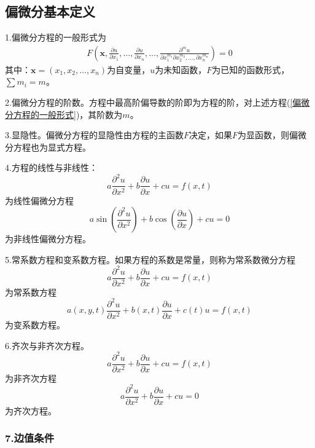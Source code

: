     \subsection{偏微分基本定义}
        \par
        1.偏微分方程的一般形式为
        \begin{align}
            \label{偏微分方程的一般形式}
            F\left ( \mathbf{x},\frac{\partial u}{\partial x_1},\dots,\frac{\partial u}{\partial x_n}, \dots,\frac{\partial ^m u}{\partial x_1^{m_1} \partial x_2^{m_2},\dots,\partial x_n^{m_n}}\right) = 0
        \end{align}
        其中：$\mathbf{x} = (x_1,x_2,\dots,x_n)$为自变量，$u$为未知函数，$F$为已知的函数形式，$\sum m_i = m$。
        \par
        2.偏微分方程的阶数。方程中最高阶偏导数的阶即为方程的阶，对上述方程(\ref{偏微分方程的一般形式})，其阶数为$m$。
        \par
        3.显隐性。偏微分方程的显隐性由方程的主函数$F$决定，如果$F$为显函数，则偏微分方程也为显式方程。
        \par
        4.方程的线性与非线性：
        \[
            a \frac{\partial^2 u}{\partial x^2} +b\frac{\partial u}{\partial x} + cu = f(x,t)
        \]
        为线性偏微分方程
        \[
            a \sin \left( \frac{\partial^2 u}{\partial x^2}\right ) +b \cos \left(\frac{\partial u}{\partial x}\right ) + cu = 0
        \]
        为非线性偏微分方程。\par
        5.常系数方程和变系数方程。如果方程的系数是常量，则称为常系数微分方程
        \[
            a \frac{\partial^2 u}{\partial x^2} +b\frac{\partial u}{\partial x} + cu = f(x,t)
        \]
        为常系数方程
        \[
            a(x,y,t) \frac{\partial^2 u}{\partial x^2} +b(x,t)\frac{\partial u}{\partial x} + c(t)u = f(x,t)
        \]
        为变系数方程。\par
        6.齐次与非齐次方程。
        \[
            a \frac{\partial^2 u}{\partial x^2} +b\frac{\partial u}{\partial x} + cu = f(x,t)
        \]
        为非齐次方程
        \[
            a \frac{\partial^2 u}{\partial x^2} +b\frac{\partial u}{\partial x} + cu = 0
        \]
        为齐次方程。

        \subsubsection{7.边值条件}
